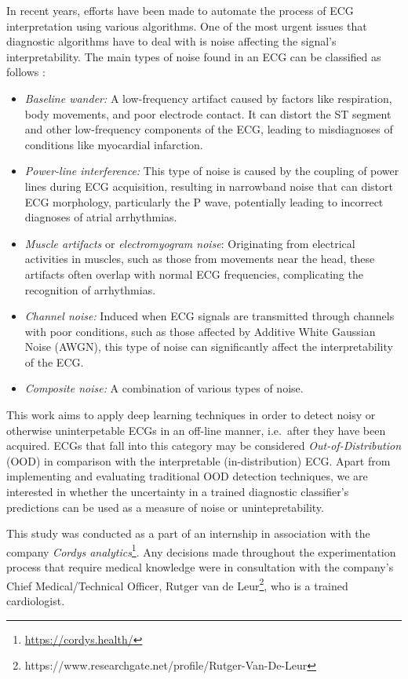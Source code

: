 \documentclass[a4paper,10pt]{article}
\begin{document}
In recent years, efforts have been made to automate the process of ECG interpretation using various algorithms. One of the most urgent issues that diagnostic algorithms have to deal with is noise affecting the signal's interpretability. The main types of noise found in an ECG can be classified as follows \cite{ecgnoisetypes}:
\begin{itemize}
	\item \emph{Baseline wander:} A low-frequency artifact caused by factors like respiration, body movements, and poor electrode contact. It can distort the ST segment and other low-frequency components of the ECG, leading to misdiagnoses of conditions like myocardial infarction.
	\item \emph{Power-line interference:} This type of noise is caused by the coupling of power lines during ECG acquisition, resulting in narrowband noise that can distort ECG morphology, particularly the P wave, potentially leading to incorrect diagnoses of atrial arrhythmias.
	\item \emph{Muscle artifacts} or \emph{electromyogram noise}: Originating from electrical activities in muscles, such as those from movements near the head, these artifacts often overlap with normal ECG frequencies, complicating the recognition of arrhythmias.
	\item \emph{Channel noise:} Induced when ECG signals are transmitted through channels with poor conditions, such as those affected by Additive White Gaussian Noise (AWGN), this type of noise can significantly affect the interpretability of the ECG.
	\item \emph{Composite noise:} A combination of various types of noise.
\end{itemize}
This work aims to apply deep learning techniques in order to detect noisy or otherwise uninterpetable ECGs in an off-line manner, i.e.\ after they have been acquired. ECGs that fall into this category may be considered \emph{Out-of-Distribution} (OOD) in comparison with the interpretable (in-distribution) ECG. Apart from implementing and evaluating traditional OOD detection techniques, we are interested in whether the uncertainty \cite{uncertainty_cordys} in a trained diagnostic classifier's predictions can be used as a measure of noise or unintepretability.

This study was conducted as a part of an internship in association with the company \emph{Cordys analytics}\footnote{\url{https://cordys.health/}}. Any decisions made throughout the experimentation process that require medical knowledge were in consultation with the company's Chief Medical/Technical Officer, Rutger van de Leur\footnote{https://www.researchgate.net/profile/Rutger-Van-De-Leur}, who is a trained cardiologist.
\end{document}
